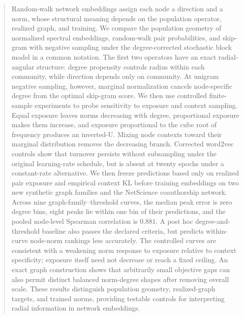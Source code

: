 \documentclass[aps,pre,reprint,superscriptaddress,longbibliography]{revtex4-2}
\begin{document}
\begin{abstract}
Random-walk network embeddings assign each node a direction and a norm, whose structural meaning depends on the population operator, realized graph, and training.
We compare the population geometry of normalized spectral embeddings, random-walk pair probabilities, and skip-gram with negative sampling under the degree-corrected stochastic block model in a common notation.
The first two operators have an exact radial-angular structure: degree propensity controls radius within each community, while direction depends only on community.
At unigram negative sampling, however, marginal normalization cancels node-specific degree from the optimal skip-gram score.
We then use controlled finite-sample experiments to probe sensitivity to exposure and context sampling.
Equal exposure leaves norms decreasing with degree, proportional exposure makes them increase, and exposure proportional to the cube root of frequency produces an inverted-U.
Mixing node contexts toward their marginal distribution removes the decreasing branch.
Corrected word2vec controls show that turnover persists without subsampling under the original learning-rate schedule, but is absent at twenty epochs under a constant-rate alternative.
We then freeze predictions based only on realized pair exposure and empirical context KL before training embeddings on two new synthetic graph families and the NetScience coauthorship network.
Across nine graph-family--threshold curves, the median peak error is zero degree bins, eight peaks lie within one bin of their predictions, and the pooled node-level Spearman correlation is \(0.881\).
A post hoc degree-and-threshold baseline also passes the declared criteria, but predicts within-curve node-norm rankings less accurately.
The controlled curves are consistent with a weakening norm response to exposure relative to context specificity; exposure itself need not decrease or reach a fixed ceiling.
An exact graph construction shows that arbitrarily small objective gaps can also permit distinct balanced norm-degree shapes after removing overall scale.
These results distinguish population geometry, realized-graph targets, and trained norms, providing testable controls for interpreting radial information in network embeddings.
\end{abstract}

\maketitle
\end{document}
